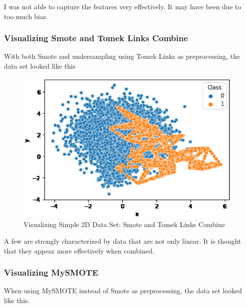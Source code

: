 I was not able to capture the features very effectively. It may have been due to too much bias.

\clearpage
\subsubsection{Visualizing Smote and Tomek Links Combine}
With both Smote and undersampling using Tomek Links as preprocessing, the data set looked like this
\begin{center}
    \begin{figure}[ht]
        \caption{Visualizing Simple 2D Data Set: Smote and Tomek Links Combine}
        \label{tab:team-rating-features}
        \begin{center}
            \includegraphics[scale=0.6]{image/combine.eps}
        \end{center}
    \end{figure}
\end{center}

A few are strongly characterized by data that are not only linear. It is thought that they appear more effectively when combined.

\clearpage
\subsubsection{Visualizing MySMOTE}
When using MySMOTE instead of Smote as preprocessing, the data set looked like this.

